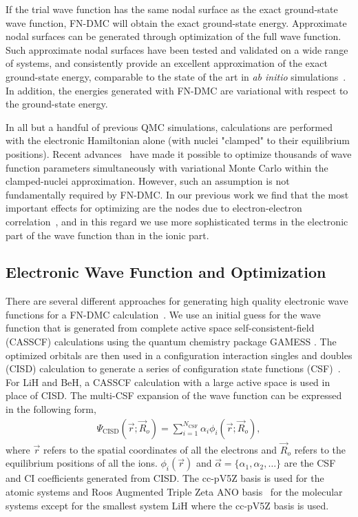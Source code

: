 \documentclass[pra,superscriptaddress,groupedaddress,twocolumn]{revtex4}
\begin{document}
If the trial wave function has the same nodal surface as the exact ground-state wave function, FN-DMC will obtain the exact ground-state energy.  Approximate nodal surfaces can be generated through optimization of the full wave function. Such approximate nodal surfaces have been tested and validated on a wide range of systems, and consistently provide an excellent approximation of the exact ground-state energy,  comparable to the state of the art in \textit{ab initio} simulations~\cite{grossman1}. In addition, the energies generated with FN-DMC are variational with respect to the ground-state energy.

In all but a handful of previous QMC simulations, calculations are performed with the electronic Hamiltonian alone (with nuclei "clamped" to their equilibrium positions). Recent advances~\cite{Nightingale_Linear,Umrigar_Linear,Brown_Bench} have made it possible to optimize thousands of wave function parameters simultaneously with variational Monte Carlo within the clamped-nuclei approximation. However, such an assumption is not fundamentally required by FN-DMC. In our previous work we find that the most important effects for optimizing are the nodes due to electron-electron correlation~\cite{Tubman_ECG}, and in this regard we use more sophisticated terms in the electronic part of the wave function than in the ionic part.

\subsection{Electronic Wave Function and Optimization}

There are several different approaches for generating high quality electronic wave functions for a FN-DMC calculation~\cite{Umrigar_Alleviation,Toulouse_Bench,Brown_Bench,Seth_Bench}. We use an initial guess for the wave function that is generated from complete active space self-consistent-field (CASSCF) \cite{Chaban_MCSCF,Szabo} calculations using the quantum chemistry package GAMESS \cite{GAMESS}. The optimized orbitals are then used in a configuration interaction singles and doubles (CISD) calculation to generate a series of configuration state functions (CSF)~\cite{Clark_Bench}. For LiH and BeH, a CASSCF calculation with a large active space is used in place of CISD. The multi-CSF expansion of the wave function can be expressed in the following form,
\begin{align}
\Psi_{\text{CISD}}(\vec{r};\vec{R}_o)=\sum\limits_{i=1}^{N_{\text{CSF}}}\alpha_i\phi_i(\vec{r};\vec{R}_o), \label{eq:psi_gms}
\end{align}
where $\vec{r}$ refers to the spatial coordinates of all the electrons and $\vec{R}_o$ refers to the equilibrium positions of all the ions. $\phi_i(\vec{r})$ and $\vec{\alpha}=\{\alpha_1,\alpha_2,\dots\}$ are the CSF and CI coefficients generated from CISD. The cc-pV5Z basis \cite{dunning} is used for the atomic systems and Roos Augmented Triple Zeta ANO basis~\cite{roos} for the molecular systems except for the smallest system LiH where the cc-pV5Z basis is used.
\end{document}
